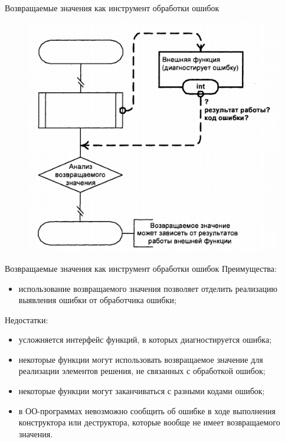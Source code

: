 \documentclass[xcolor=table]{beamer}
\begin{document}
\begin{frame}{Возвращаемые значения как инструмент обработки ошибок}
	\begin{figure}[h]
		\centering
		\includegraphics[scale=0.5]{images/lec08-pic01.png}
	\end{figure}
\end{frame}

\begin{frame}{Возвращаемые значения как инструмент обработки ошибок}
	Преимущества:
	\begin{itemize}	
		\item использование возвращаемого значения позволяет отделить реализацию выявления ошибки от обработчика ошибки; 	
	\end{itemize}
	Недостатки: 
	\begin{itemize}
		\item усложняется интерфейс функций, в которых диагностируется ошибка;
		\item некоторые функции могут использовать возвращаемое значение для реализации элементов решения, не связанных с обработкой ошибок; 
		\item некоторые функции могут заканчиваться с разными кодами ошибок;
		\item в ОО-программах невозможно сообщить об ошибке в ходе выполнения конструктора или деструктора, которые вообще не имеет возвращаемого значения.
	\end{itemize}
\end{frame}
\end{document}
